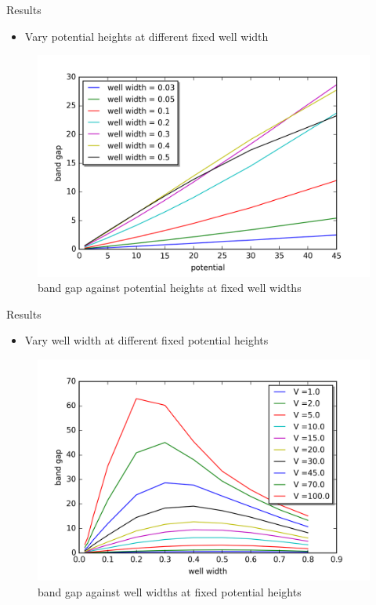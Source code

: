 \documentclass{beamer}
\begin{document}
\begin{frame}{Results}
\begin{itemize}
    \item Vary potential heights at different fixed well width
\end{itemize}
\begin{figure}
\includegraphics[width=0.8\linewidth]{potentialHeights.png}
\caption{band gap against potential heights at fixed well widths}
\end{figure}
\end{frame}

\begin{frame}{Results}
\begin{itemize}
    \item Vary well width at different fixed potential heights
\end{itemize}
\begin{figure}
\includegraphics[width=0.8\linewidth]{changeWell.png}
\caption{band gap against well widths at fixed potential heights}
\end{figure}
\end{frame}
\end{document}
